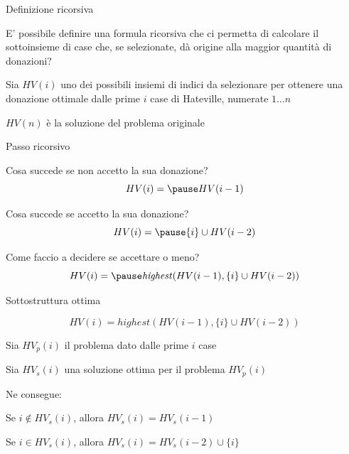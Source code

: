 \begin{frame}{Definizione ricorsiva}

\vspace{-9pt}
\begin{myboxtitle}
E' possibile definire una formula ricorsiva che ci permetta di calcolare
il sottoinsieme di case che, se selezionate, dà origine alla maggior quantità di donazioni?
\end{myboxtitle}

\bigskip
{}
\BIL
\item Sia $HV(i)$ uno dei possibili insiemi di indici da selezionare per ottenere una donazione ottimale dalle prime $i$ case di Hateville, numerate $1 \ldots n$ 
\item $HV(n)$ è la soluzione del problema originale
\EIL

\end{frame}

\begin{frame}{Passo ricorsivo}

\vspace{-9pt}
\BI
\item Cosa succede se non accetto la sua donazione?
\EI
\[
HV(i) = \pause HV(i-1)
\]

\BI
\item Cosa succede se accetto la sua donazione?
\EI
\[
HV(i) = \pause \{ i \} \cup HV(i-2)  
\]

\BI
\item Come faccio a decidere se accettare o meno?
\EI
\[
HV(i) = \pause \mathit{highest}(HV(i-1), \{ i \} \cup HV(i-2)  )
\]

\end{frame}

\begin{frame}{Sottostruttura ottima}

\[
HV(i) = \mathit{highest}(HV(i-1), \{ i \} \cup HV(i-2)  )
\]

\pause
\begin{myboxtitle}
\BIL
\item Sia $HV_p(i)$ il problema dato dalle prime $i$ case
\item Sia $HV_s(i)$ una soluzione ottima per il problema $HV_p(i)$
\item Ne consegue:
  \BI
  \item Se $i \not\in HV_s(i)$, allora $HV_s(i)=HV_s(i-1)$
  \item Se $i \in HV_s(i)$, allora $HV_s(i)=HV_s(i-2) \cup \{i\}$
  \EI
\EIL    
\end{myboxtitle}

\end{frame}


